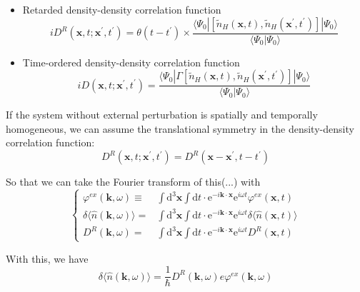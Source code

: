 \begin{itemize}
\item Retarded density-density correlation function
\begin{equation*} \label{Eqs3.1.12'} \tag{3.1.12'}
i D^R(\mathbf{x},t;\mathbf{x}^{'},t^{'}) = \theta(t-t^{'}) \times \frac{\langle \Psi_0 | [\tilde{n}_H(\mathbf{x},t), \tilde{n}_H(\mathbf{x}^{'},t^{'})] | \Psi_0 \rangle}{\langle \Psi_0 | \Psi_0 \rangle}
\end{equation*}

\item Time-ordered density-density correlation function
\begin{equation*} \label{Eqs2.8.2'} \tag{2.8.2'}
i D(\mathbf{x},t;\mathbf{x}^{'},t^{'}) = \frac{\langle \Psi_0 | \Gamma[\tilde{n}_H(\mathbf{x},t), \tilde{n}_H(\mathbf{x}^{'},t^{'})] | \Psi_0 \rangle}{\langle \Psi_0 | \Psi_0 \rangle}
\end{equation*}
\end{itemize}

If the system without external perturbation is spatially and temporally homogeneous, we can assume the translational symmetry in the density-density correlation function:
\begin{equation} \label{Eqs3.1.13}
D^R(\mathbf{x},t;\mathbf{x}^{'},t^{'}) = D^R(\mathbf{x}-\mathbf{x}^{'},t-t^{'})
\end{equation}

So that we can take the Fourier transform of this(...) with
\begin{equation} \label{Eqs3.1.14}
\left\{ \begin{split}
\varphi^{ex}(\mathbf{k},\omega) \equiv& \int \mathrm{d}^3 \mathbf{x} \int \mathrm{d} t\cdot \mathrm{e}^{-i \mathbf{k} \cdot \mathbf{x}} \mathrm{e}^{i \omega t} \varphi^{ex}(\mathbf{x},t)\\
\delta \langle \hat{n}(\mathbf{k},\omega) \rangle =& \int \mathrm{d}^3 \mathbf{x} \int \mathrm{d} t\cdot \mathrm{e}^{-i \mathbf{k} \cdot \mathbf{x}} \mathrm{e}^{i \omega t} \delta \langle \hat{n}(\mathbf{x},t) \rangle\\
D^R(\mathbf{k},\omega) =& \int \mathrm{d}^3 \mathbf{x} \int \mathrm{d} t\cdot \mathrm{e}^{-i \mathbf{k} \cdot \mathbf{x}} \mathrm{e}^{i \omega t} D^R(\mathbf{x},t)
\end{split} \right.
\end{equation}

With this, we have
\begin{equation} \label{Eqs3.1.15}
\delta \langle \hat{n}(\mathbf{k},\omega) \rangle = \frac{1}{\hbar} D^R(\mathbf{k},\omega) e \varphi^{ex}(\mathbf{k},\omega)
\end{equation}


